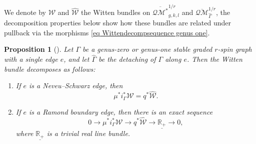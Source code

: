 \documentclass[11pt]{amsart}
\newtheorem{pr}[dummy]{Proposition}
\theoremstyle{definition}
\theoremstyle{remark}
\newcommand{\oQMb}{{\overline{\mathcal{QM}}}}
\newcommand{\<}{\left<}
\renewcommand{\>}{\right>}
\numberwithin{equation}{section}
\begin{document}
We denote by ${\mathcal{W}}$ and $\widehat{{\mathcal{W}}}$ the Witten bundles on $\overline{\mathcal{QM}^*}_{g,k,l}^{1/r}$ and %
$\oQMb_{\widehat{\Gamma}}^{1/r}$, the decomposition %
properties below show how these bundles are related under pullback via the morphisms \eqref{eq Wittendecompsequence genus one}.  

\begin{pr}[{\cite[Proposition 2.20]{TZ1}}]
\label{prop decomposition}
Let $\Gamma$ be a genus-zero or genus-one stable graded $r$-spin graph with a single edge $e$, and let $\widehat{\Gamma}$ be the detaching of $\Gamma$ along $e$.  Then the Witten bundle decomposes %
as follows:
\begin{enumerate}
\item\label{it NS} If %
$e$ is a Neveu--Schwarz edge, %
then \begin{equation}\label{eq NSdecompses}
\mu^*i_{\Gamma}^*{\mathcal{W}} = q^*\widehat{{\mathcal{W}}}.
\end{equation}

\item\label{it decompose Ramond boundary edge} If %
$e$ is a Ramond boundary edge, then there is an exact sequence
\begin{equation}
\label{eq decompose}0 \to \mu^*i_{\Gamma}^*{\mathcal{W}} \to q^*\widehat{{\mathcal{W}}} \to \underline{\mathbb{R}_+} \to 0,
\end{equation}
where $\underline{\mathbb{R}_+}$ is a trivial real line %
bundle.


\end{enumerate}
\end{pr}
\end{document}
